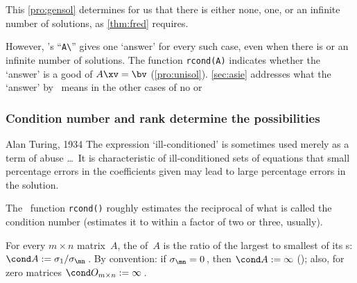 This \cref{pro:gensol} determines for us that there is either none, one, or an infinite number of solutions, as \cref{thm:fred} requires.

However,  \script's ``\verb|A\|'' gives one `answer' for every such case, even when there is  or an infinite number of solutions.
The function \verb|rcond(A)| indicates whether the `answer' is a good  of \(A\xv=\bv\) (\cref{pro:unisol}).
\cref{sec:asie} addresses what the `answer' by \script\ means in the other cases of no or 





\subsubsection{Condition number and rank determine the possibilities}

\begin{quoted}{Alan Turing, 1934 \cite[p.131]{Higham1996}}
The expression `ill-conditioned' is sometimes used merely as a term of abuse \ldots\ 
It is characteristic of ill-conditioned sets of equations that small percentage errors in the coefficients given may lead to large percentage errors in the solution.
\end{quoted}

The \script\ function \verb|rcond()| roughly estimates the reciprocal of what is called the condition number (estimates it to within a factor of two or three, usually).

\begin{definition} \label{def:condnum}
For every \(m\times n\) matrix~\(A\),
the  of~\(A\) is the ratio of the largest to smallest of its s: \(\cond A:=\sigma_1/\sigma_{\mn}\)\,. 
By convention: if \(\sigma_{\mn}=0\)\,, then \(\cond A:=\infty\) (\idx{infinity}); 
also, for zero matrices \(\cond O_{m\times n}:=\infty\)\,.
\end{definition}

